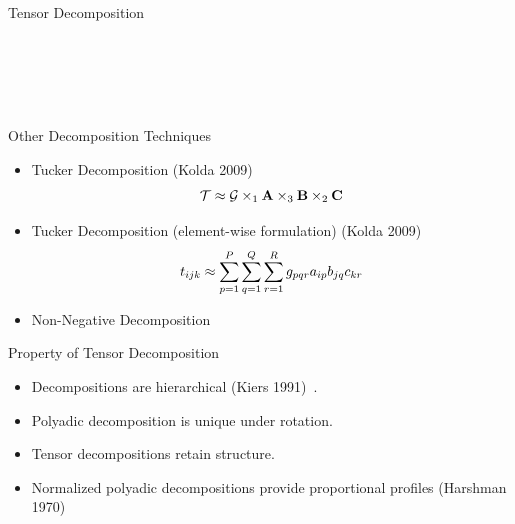 \documentclass[handout]{beamer}
\begin{document}
\begin{frame}{Tensor Decomposition}
\begin{columns}
\begin{figure}
{  }\\
\end{figure}
\end{columns}
\end{frame}

\begin{frame}{Other Decomposition Techniques}
  \begin{itemize}
  \item Tucker Decomposition (Kolda 2009)~\cite{kolda2009}
    \[
      \mathcal{T} \approx \mathcal{G} \times_1 \mathrm{\bf A} \times_3 \mathrm{\bf B} \times_2
  \mathrm{\bf C}
\]
  \item Tucker Decomposition (element-wise formulation) (Kolda
    2009)~\cite{kolda2009}
    \[
        t_{ijk} \approx \displaystyle\sum_{p=1}^P \displaystyle\sum_{q=1}^Q \displaystyle\sum_{r=1}^R
  g_{pqr}a_{ip}b_{jq}c_{kr}
\]
\item Non-Negative Decomposition
  \end{itemize}
\end{frame}

\begin{frame}{Property of Tensor Decomposition}
  \begin{itemize}[<+->]
  \item Decompositions are hierarchical (Kiers 1991)~\cite{kiers1991}.
  \item Polyadic decomposition is unique under rotation.
  \item Tensor decompositions retain structure.
  \item Normalized polyadic decompositions provide proportional
    profiles (Harshman 1970)~\cite{harshman1970}
  \end{itemize}
\end{frame}
\end{document}
